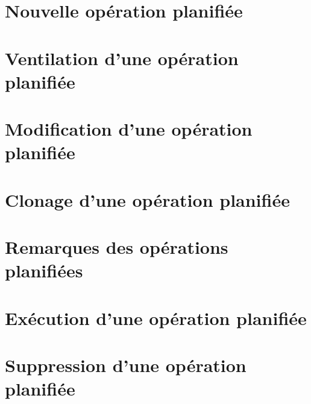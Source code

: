 \section{Nouvelle opération planifiée\label{plannedtransactions-new}}


\section{Ventilation d'une opération planifiée\label{plannedtransactions-breakdown}}


\section{Modification d'une opération planifiée\label{plannedtransactions-modify}}



\section{Clonage d'une opération planifiée\label{plannedtransactions-duplicate}}

\section{Remarques des opérations planifiées\label{plannedtransactions-comments}}


\section{Exécution d'une opération planifiée\label{plannedtransactions-execution}}


\section{Suppression d'une opération planifiée\label{plannedtransactions-remove}}



